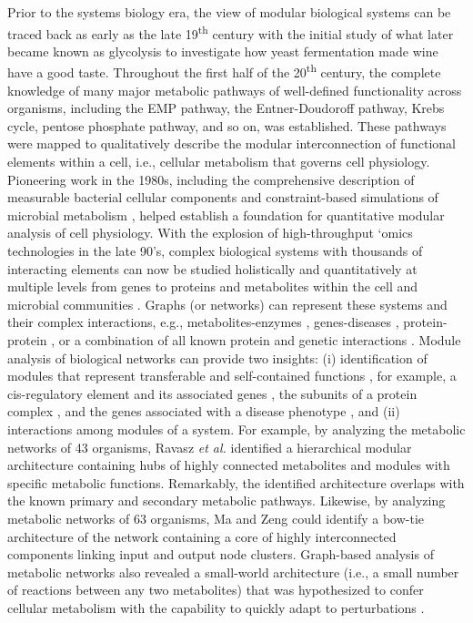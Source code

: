 Prior to the systems biology era, the view of modular biological systems can be traced back as early as the late 19\textsuperscript{th} century with the initial study of what later became known as glycolysis to investigate how yeast fermentation made wine have a good taste.
Throughout the first half of the 20\textsuperscript{th} century, the complete knowledge of many major metabolic pathways of well-defined functionality across organisms, including the EMP pathway, the Entner-Doudoroff pathway, Krebs cycle, pentose phosphate pathway, and so on, was established.
These pathways were mapped to qualitatively describe the modular interconnection of functional elements within a cell, i.e., cellular metabolism that governs cell physiology.
Pioneering work in the 1980s, including the comprehensive description of measurable bacterial cellular components \citep{neidhardt1990} and constraint-based simulations of microbial metabolism \citep{fell1986}, helped establish a foundation for quantitative modular analysis of cell physiology.
With the explosion of high-throughput `omics technologies in the late 90's, complex biological systems with thousands of interacting elements can now be studied holistically and quantitatively at multiple levels from genes to proteins and metabolites within the cell and microbial communities \citep{rodriguez2014, lowe2017, patti2012, wilkins1996}.
Graphs (or networks) can represent these systems \citep{alon2003} and their complex interactions, e.g., metabolites-enzymes \citep{ma2003, ravasz2002}, genes-diseases \citep{goh2007}, protein-protein \citep{szklarczyk2017}, or a combination of all known protein and genetic interactions \citep{chatr-aryamontri2017}.
Module analysis of biological networks can provide two insights: (i) identification of modules that represent transferable and self-contained functions \citep{mitra2013}, for example, a cis-regulatory element and its associated genes \citep{ohta2008}, the subunits of a protein complex \citep{guruharsha2011, havugimana2012}, and the genes associated with a disease phenotype \citep{goh2007}, and (ii) interactions among modules of a system.
For example, by analyzing the metabolic networks of 43 organisms, Ravasz \emph{et al.} \citep{ravasz2002} identified a hierarchical modular architecture containing hubs of highly connected metabolites and modules with specific metabolic functions.
Remarkably, the identified architecture overlaps with the known primary and secondary metabolic pathways.
Likewise, by analyzing metabolic networks of 63 organisms, Ma and Zeng \citep{ma2003} could identify a bow-tie architecture of the network containing a core of highly interconnected components linking input and output node clusters.
Graph-based analysis of metabolic networks also revealed a small-world architecture (i.e., a small number of reactions between any two metabolites) that was hypothesized to confer cellular metabolism with the capability to quickly adapt to perturbations \citep{wagner2001}.

